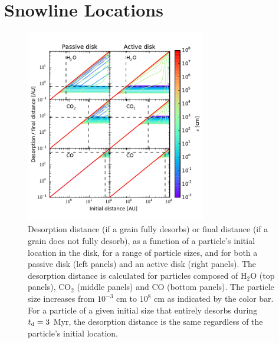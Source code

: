 \documentclass[apj]{emulateapj}
\begin{document}
\section{Snowline Locations}
\label{sec:snowlines}

\begin{figure}[tb]
\centering
\includegraphics[width=0.7\textwidth]{../../figs/desorption_distance_passive_active_colorbar_test.pdf}
\caption{Desorption distance (if a grain fully desorbs) or final distance (if a grain does not fully desorb), as a function of a particle's initial location in the disk, for a range of particle sizes, and for both a passive disk (left panels) and an active disk (right panels). The desorption distance is calculated for particles composed of H$_2$O (top panels), CO$_2$ (middle panels) and CO (bottom panels). The particle size increases from $10^{-3}$ cm to $10^8$ cm as indicated by the color bar. For a particle of a given initial size that entirely desorbs during $t_{\rm d}=3$ Myr, the desorption distance is the same regardless of the particle's initial location.} 
\label{fig:snowlines}
\end{figure}
\end{document}
